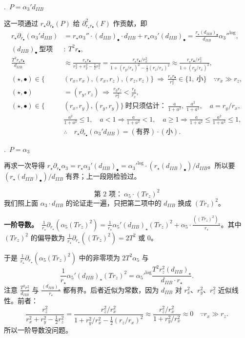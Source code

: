 \medskip
{}.\ $P=\alpha_3'd_{IIB}$

这一项通过 $r_\star\partial_{r_\bullet}(P)$ 给 $\partial^2_{r_\star r_\bullet}(F)$ 作贡献，即
\begin{align*}
r_\star\partial_{r_\bullet}(\alpha_3'd_{IIB})
&=r_\star\alpha_3''\cdot(d_{IIB})_\bullet\cdot d_{IIB}+r_\star\alpha_3'(d_{IIB})_\bullet
=\frac{r_\star(d_{IIB})_\bullet}{d_{IIB}}{\alpha_3''}^{\log},\\
(d_{IIB})_\bullet\ \text{型项}&:\ T^2r_\bullet,\\
\frac{T^2r_\star r_\bullet}{d_{IIB}}
&\approx\frac{r_\star r_\bullet}{r_x^2+r_y^2-\frac12r_z^2}
=\frac{r_\star r_\bullet/r_x^2}{1+(r_y/r_x)^2-\frac12(r_z/r_x)^2}
\approx\frac{r_\star r_\bullet/r_x^2}{1+(r_y/r_x)^2},\\
(\star,\bullet)\in\{&(r_x,r_x),(r_x,r_z),(r_z,r_z)\}\ \Longrightarrow\ \frac{r_\star r_\bullet}{r_x^2}\in\{1,\ \text{小}\}\quad\because r_x\gg r_z,\\
(\star,\bullet)&=(r_y,r_z)\ \Longrightarrow\ \frac{r_yr_z}{r_x^2}<\frac{r_y}{r_x},\\
(\star,\bullet)\in\{&(r_x,r_y),(r_y,r_y)\}\ \text{时只须估计：}\ \frac{a}{1+a^2},\ \frac{a^2}{1+a^2},\quad a=r_y/r_x,\\
&\frac{a^2}{1+a^2}\le1,\quad a<1\Longrightarrow\frac{a}{1+a^2}<1,\quad a\ge1\Longrightarrow\frac{a}{1+a^2}\le\frac{a^2}{1+a^2}\le1,\\
&\therefore\quad r_\star\partial_{r_\bullet}(\alpha_3'd_{IIB})=(\text{有界})\cdot(\text{小}).
\end{align*}

\medskip
{}.\ $P=\alpha_3$

再求一次导得 $r_\star\partial_{r_\bullet}\alpha_3=r_\star\alpha_3'(d_{IIB})_\bullet={\alpha_3'}^{\log}\cdot(r_\star(d_{IIB})_\bullet)/d_{IIB}$。所以要 $(r_\star(d_{IIB})_\bullet)/d_{IIB}$ 有界；上一段刚检验过。

\[
\text{第 2 项：}\ \alpha_5\cdot(Tr_z)^2
\]
我们照上面 $\alpha_3\cdot d_{IIB}$ 的论证走一遍，只把第二项中的 $d_{IIB}$ 换成 $(Tr_z)^2$。

\noindent\textbf{一阶导数。}\ $\frac{1}{r_\star}\partial_{r_\star}(\alpha_5(Tr_z)^2)=\frac{1}{r_\star}\alpha_5'(d_{IIB})_\star(Tr_z)^2+\alpha_5\cdot\frac{((Tr_z)^2)_\star}{r_\star}$。其中 $(Tr_z)^2$ 的偏导数为 $\frac{1}{r_\star}\partial_{r_\star}((Tr_z)^2)=2T^2$ 或 $0$。

于是 $\frac{1}{r_\star}\partial_{r_\star}(\alpha_5(Tr_z)^2)$ 中的非零项为 $2T^2\alpha_5$ 与
\[
\frac{1}{r_\star}\alpha_5'(d_{IIB})_\star(Tr_z)^2={\alpha_5'}^{\log}\frac{T^2r_z^2(d_{IIB})_\star}{d_{IIB}\cdot r_\star}.
\]
注意 $\frac{T^2r_z^2}{d_{IIB}}$ 与 $\frac{(d_{IIB})_\star}{r_\star}$ 都有界。后者近似为常数，因为 $d_{IIB}$ 对 $r_x^2$、$r_y^2$、$r_z^2$ 近似线性。前者：
\[
\frac{r_z^2}{r_x^2+r_y^2-\frac12r_z^2}
=\frac{r_z^2/r_x^2}{1+r_y^2/r_x^2-\frac12(r_z/r_x)^2}
\approx\frac{r_z^2/r_x^2}{1+r_y^2/r_x^2}\approx0\quad\because r_x\gg r_z.
\]
所以一阶导数没问题。

